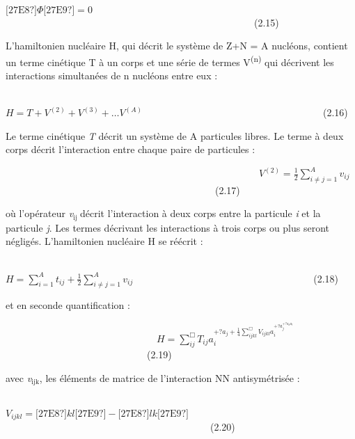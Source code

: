 \documentclass[a4paper]{article}
\providecommand\textsubscript[1]{\ensuremath{{}_{\text{#1}}}}
\begin{document}
\ \ \ \ \ \ \ \ \ \ \ \ \ \ \ \ \ \ \ \ \ \ \ \ \ \ \ \ \ \ \ \ \ \ \ \ \ \ \ \ \ \ \ \ \ \ \ \ \ \ \ \ \ \ \ \ \ \ \ \ \ 
$\text{[27E8?]}\Phi
\text{[27E9?]}=0$\ \ \ \ \ \ \ \ \ \ \ \ \ \ \ \ \ \ \ \ \ \ \ \ \ \ \ \ \ \ \ \ \ \ \ \ \ \ \ \ \ \ \ \ \ \ \ \ \ \ \ (2.15)
\ 

L’hamiltonien nucléaire H, qui décrit le système de Z+N = A nucléons, contient un terme cinétique T à un corps et une
série de termes V\textsuperscript{(n)} qui décrivent les interactions simultanées de n nucléons entre eux :
\ \ \ \ \ \ \ \ \ \ \ \ \ 

\ \ \ \ \ \ \ \ \ \ \ \ \ \ \ \ \ \ \ \ \ \ \ \ \ \ \ \ \ \ \ \ \ \ \ \ \ \ \ \ \ \ \ \ 
$H=T+V^{\left(2\right)}+V^{\left(3\right)}+{\dots}V^{\left(A\right)}$\ \ \ \ \ \ \ \ \ \ \ \ \ \ \ \ \ \ \ \ \ \ \ \ \ \ \ \ \ \ \ \ \ \ \ \ \ (2.16)

Le terme cinétique \textit{T} décrit un système de A particules libres. Le terme à deux corps décrit l’interaction entre
chaque paire de particules :

\ \ \ \ \ \ \ \ \ \ \ \ \ \ \ \ \ \ \ \ \ \ \ \ \ \ \ \ \ \ \ \ \ \ \ \ \ \ \ \ \ \ \ \ \ \ \ \ \ \ \ \ 
$V^{\left(2\right)}=\frac 1 2\sum
_{i{\neq}j=1}^Av_{\mathit{ij}}$\ \ \ \ \ \ \ \ \ \ \ \ \ \ \ \ \ \ \ \ \ \ \ \ \ \ \ \ \ \ \ \ \ \ \ \ \ \ \ \ \ \ \ (2.17)

où l’opérateur \textit{v}\textsubscript{ij }décrit l’interaction à deux corps entre la particule \textit{i} et la
particule \textit{j}. Les termes décrivant les interactions à trois corps ou plus seront négligés. L’hamiltonien
nucléaire H se réécrit :

\ \ \ \ \ \ \ \ \ \ \ \ \ \ \ \ \ \ \ \ \ \ \ \ \ \ \ \ \ \ \ \ \ \ \ \ \ \ \ \ \ \ \ \ \ \ \ \ \ \  $H=\sum
_{i=1}^At_{\mathit{ij}}+\frac 1 2\sum
_{i{\neq}j=1}^Av_{\mathit{ij}}$\ \ \ \ \ \ \ \ \ \ \ \ \ \ \ \ \ \ \ \ \ \ \ \ \ \ \ \ \ \ \ \ \ \ \ \ \ (2.18)

et en seconde quantification :

\ \ \ \ \ \ \ \ \ \ \ \ \ \ \ \ \ \ \ \ \ \ \ \ \ \ \ \ \ \ \  $H=\sum _{\mathit{ij}}^{\Box
}T_{\mathit{ij}}a_i^{+?a_j+\frac 1 4\sum _{\mathit{ijkl}}^{\Box
}V_{\mathit{ijkl}}a_i^{+?a_j^{+?a_ka_l}}}$\ \ \ \ \ \ \ \ \ \ \ \ \ \ \ \ \ \ \ \ \ \ \ \ \ \ \ \ \ (2.19)

avec \textit{v}\textit{\textsubscript{ijk}}, les éléments de matrice de l’interaction NN antisymétrisée :

\ \ \ \ \ \ \ \ \ \ \ \ \ \ \ \ \ \ \ \ \ \ \ \ \ \ \ \ \ \ \ \ \ \ \ \ \ \ \ \ \ \ \ \ \ \ \ \ \ \ \ \ 
$V_{\mathit{ijkl}}=\text{[27E8?]}\mathit{kl}\text{[27E9?]}-\text{[27E8?]}\mathit{lk}\text{[27E9?]}$\ \ \ \ \ \ \ \ \ \ \ \ \ \ \ \ \ \ \ \ \ \ \ \ \ \ \ \ \ \ \ \ \ \ \ \ \ \ \ \ \ \ (2.20)
\end{document}
